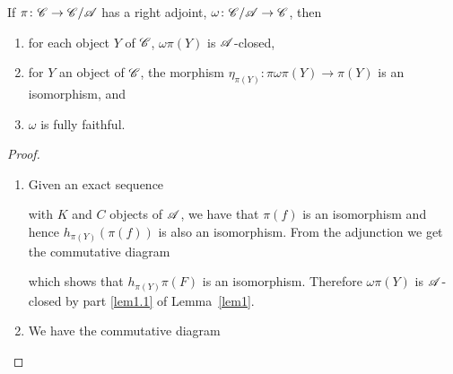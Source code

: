 \documentclass[dissertation.tex]{subfiles}
\begin{document}
\begin{lem}\label{lem4}
  If $\pi \colon \CC \rightarrow \CC/\A$ has a right adjoint, $\omega \colon \CC/\A \rightarrow \CC$, then
  \begin{enumerate}
  \item\label{lem4.1}
    for each object $Y$ of $\CC$, $\omega\pi(Y)$ is $\A$-closed,
  \item\label{lem4.2}
    for $Y$ an object of $\CC$, the morphism $\eta_{\pi(Y)} : \pi\omega\pi(Y) \rightarrow \pi(Y)$ is an isomorphism, and
  \item\label{lem4.3}
    $\omega$ is fully faithful.
  \end{enumerate}
  
  \begin{proof}
    \begin{enumerate}
    \item
      Given an exact sequence 
      \begin{center}
      \end{center}
      with $K$ and $C$ objects of $\A$, we have that $\pi(f)$ is an isomorphism and hence $h_{\pi(Y)}(\pi(f))$ is also an isomorphism.
      From the adjunction we get the commutative diagram
      \begin{center}
      \end{center}
      which shows that $h_{\pi(Y)}{\pi(F)}$ is an isomorphism.
      Therefore $\omega\pi(Y)$ is $\A$-closed by part \ref{lem1.1} of Lemma~\ref{lem1}.
    \item
      We have the commutative diagram
      \begin{center}
        \begin{tikzcd}

\end{tikzcd}
\end{center}
\end{enumerate}
\end{proof}
\end{lem}
\end{document}
